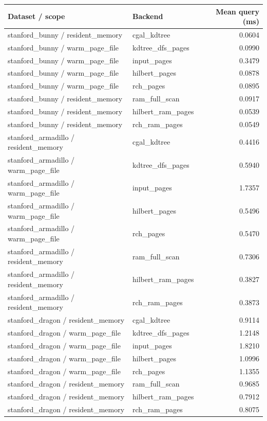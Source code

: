 \begin{tabular}{llr}
Dataset / scope & Backend & Mean query (ms) \\
\hline
stanford\_bunny / resident\_memory & cgal\_kdtree & 0.0604 \\
stanford\_bunny / warm\_page\_file & kdtree\_dfs\_pages & 0.0990 \\
stanford\_bunny / warm\_page\_file & input\_pages & 0.3479 \\
stanford\_bunny / warm\_page\_file & hilbert\_pages & 0.0878 \\
stanford\_bunny / warm\_page\_file & rch\_pages & 0.0895 \\
stanford\_bunny / resident\_memory & ram\_full\_scan & 0.0917 \\
stanford\_bunny / resident\_memory & hilbert\_ram\_pages & 0.0539 \\
stanford\_bunny / resident\_memory & rch\_ram\_pages & 0.0549 \\
stanford\_armadillo / resident\_memory & cgal\_kdtree & 0.4416 \\
stanford\_armadillo / warm\_page\_file & kdtree\_dfs\_pages & 0.5940 \\
stanford\_armadillo / warm\_page\_file & input\_pages & 1.7357 \\
stanford\_armadillo / warm\_page\_file & hilbert\_pages & 0.5496 \\
stanford\_armadillo / warm\_page\_file & rch\_pages & 0.5470 \\
stanford\_armadillo / resident\_memory & ram\_full\_scan & 0.7306 \\
stanford\_armadillo / resident\_memory & hilbert\_ram\_pages & 0.3827 \\
stanford\_armadillo / resident\_memory & rch\_ram\_pages & 0.3873 \\
stanford\_dragon / resident\_memory & cgal\_kdtree & 0.9114 \\
stanford\_dragon / warm\_page\_file & kdtree\_dfs\_pages & 1.2148 \\
stanford\_dragon / warm\_page\_file & input\_pages & 1.8210 \\
stanford\_dragon / warm\_page\_file & hilbert\_pages & 1.0996 \\
stanford\_dragon / warm\_page\_file & rch\_pages & 1.1355 \\
stanford\_dragon / resident\_memory & ram\_full\_scan & 0.9685 \\
stanford\_dragon / resident\_memory & hilbert\_ram\_pages & 0.7912 \\
stanford\_dragon / resident\_memory & rch\_ram\_pages & 0.8075 \\

\end{tabular}
